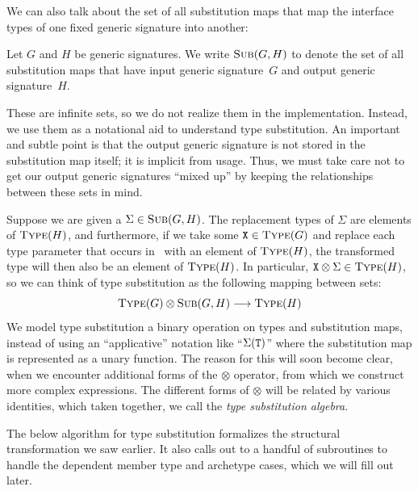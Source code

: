 \documentclass[../generics]{subfiles}
\begin{document}
We can also talk about the set of all substitution maps that map the interface types of one fixed generic signature into another:
\begin{definition}
Let $G$ and $H$ be generic signatures. We write $\textsc{Sub}({G, H})$ to denote the set of all substitution maps that have input generic signature~$G$ and output generic signature~$H$.
\end{definition}

These are infinite sets, so we do not realize them in the implementation. Instead, we use them as a notational aid to understand type substitution. An important and subtle point is that the output generic signature is not stored in the substitution map itself; it is implicit from usage. Thus, we must take care not to get our output generic signatures ``mixed up'' by keeping the relationships between these sets in mind.

Suppose we are given a $\Sigma\in\textsc{Sub}({G, H})$. The replacement types of $\Sigma$ are elements of $\textsc{Type}({H})$, and furthermore, if we take some $\texttt{X}\in\textsc{Type}({G})$ and replace each type parameter that occurs in \tX\ with an element of $\textsc{Type}({H})$, the transformed type will then also be an element of $\textsc{Type}({H})$. In particular, $\texttt{X}\otimes\Sigma\in\textsc{Type}({H})$, so we can think of type substitution as the following mapping between sets:
\[\textsc{Type}({G})\otimes\textsc{Sub}({G, H})\longrightarrow\textsc{Type}({H})\]
We model type substitution a binary operation on types and substitution maps, instead of using an ``applicative'' notation like ``$\Sigma(\texttt{T})$'' where the substitution map is represented as a unary function. The reason for this will soon become clear, when we encounter additional forms of the \index{$\otimes$}$\otimes$ operator, from which we construct more complex expressions. The different forms of $\otimes$ will be related by various identities, which taken together, we call the \emph{type substitution algebra}.

The below algorithm for type substitution formalizes the structural transformation we saw earlier. It also calls out to a handful of subroutines to handle the dependent member type and archetype cases, which we will fill out later.
\end{document}
